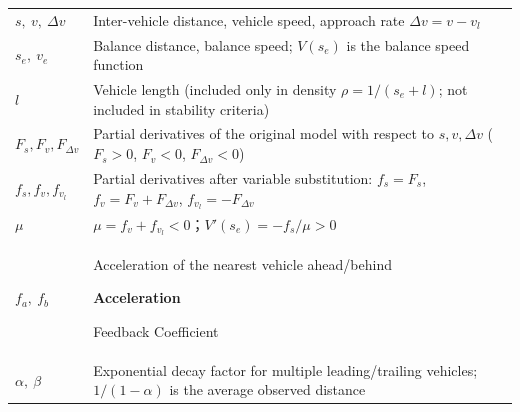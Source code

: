 \documentclass[11pt,a4paper,openany]{book}
\numberwithin{equation}{chapter}
\numberwithin{figure}{chapter}
\numberwithin{table}{chapter}
\newcommand{\dv}{\Delta v}
\begin{document}
\begin{center}
\small
{}
\label{tab:symbols}
\begin{tabular}{p{2.4cm}p{11.4cm}}
\toprule
$s,\ v,\ \dv$ &




 Inter-vehicle distance, vehicle speed, approach rate $\dv=v-v_l$



\\
$s_e,\ v_e$ &




 Balance distance, balance speed; $V(s_e)$ is the balance speed function



\\
$l$ &




Vehicle length (included only in density $\rho=1/(s_e+l)$; not included in stability criteria)



\\
\midrule
$F_s,F_v,F_{\dv}$ &




 Partial derivatives of the original model with respect to $s,v,\dv$ ($F_s>0$, $F_v<0$, $F_{\dv}<0$)



\\
$f_s,f_v,f_{v_l}$ &




 Partial derivatives after variable substitution: $f_s=F_s$, $f_v=F_v+F_{\dv}$, $f_{v_l}=-F_{\dv}$



\\
$\mu$ & $\mu=f_v+f_{v_l}<0$；$V'(s_e)=-f_s/\mu>0$ \\
\midrule
$f_a,\ f_b$ &




Acceleration of the nearest vehicle ahead/behind




\textbf{Acceleration}




Feedback Coefficient



\\
$\alpha,\ \beta$ &




Exponential decay factor for multiple leading/trailing vehicles; $1/(1-\alpha)$ is the average observed distance




\end{tabular}
\end{center}
\end{document}
